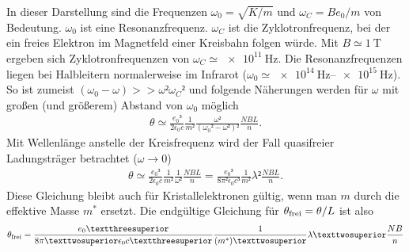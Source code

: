 In dieser Darstellung sind die Frequenzen $\omega_0 = \sqrt{K/m}$ und $\omega_C
	= Be_0/m$ von Bedeutung. $\omega_0$ ist eine Resonanzfrequenz. $\omega_C$ ist
die Zyklotronfrequenz, bei der ein freies Elektron im Magnetfeld einer
Kreisbahn folgen würde. Mit $B \simeq \qty{1}{\tesla}$ ergeben sich
Zyklotronfrequenzen von $\omega_C \simeq \qty{e11}{\hertz}$. Die
Resonanzfrequenzen liegen bei Halbleitern normalerweise im Infrarot ($\omega_0
	\simeq \qtyrange{e14}{e15}{\hertz}$). So ist zumeist $(\omega_0- \omega)>>
	\omega² \omega_C²$ und folgende Näherungen werden für $\omega$ mit großen (und
größerem) Abstand von $\omega_0$ möglich
\begin{align}
	\theta \simeq \frac{e_0³}{2\epsilon_0 c}\frac{1}{m²}\frac{\omega²}{(\omega_0²- \omega²)²}\frac{NBL}{n}.%
\end{align}
Mit Wellenlänge anstelle der Kreisfrequenz wird der Fall quasifreier Ladungsträger betrachtet ($\omega \rightarrow 0$)
\begin{align}
	\theta \simeq  \frac{e_0³}{2\epsilon_0 c}\frac{1}{m²}\frac{1}{\omega²}\frac{NBL}{n}%
	= \frac{e_0³}{8\pi²\epsilon_0 c³}\frac{1}{m²}\lambda²\frac{NBL}{n}.
\end{align}
Diese Gleichung bleibt auch für Kristallelektronen gültig, wenn man $m$ durch die effektive Masse $m^*$ ersetzt.
Die endgültige Gleichung für $\theta_\text{frei} = \theta / L$ ist also
\begin{align}
	\theta_\t{frei} = \frac{e_0³}{8\pi²\epsilon_0 c³}\frac{1}{(m^*)²}\lambda²\frac{NB}{n}
	\label{eq:theta_final}
\end{align}




